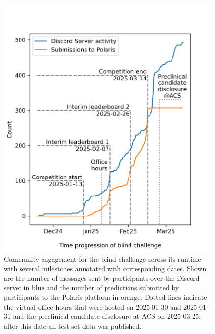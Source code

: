 \documentclass[journal=jacsat,manuscript=article]{achemso}
\begin{document}
\begin{figure}
    \includegraphics[scale=0.6]{02_figs_community/community_progression_lineplots.png}
  \caption{Community engagement for the blind challenge across its runtime with several milestones annotated with corresponding dates. Shown are the number of messages sent by participants over the Discord server in blue and the number of predictions submitted by participants to the Polaris platform in orange. Dotted lines indicate the virtual office hours that were hosted on 2025-01-30 and 2025-01-31 and the preclinical candidate disclosure at ACS on 2025-03-25; after this date all test set data was published.}
  \label{fgr:timeline_engagement}
\end{figure}
\end{document}
